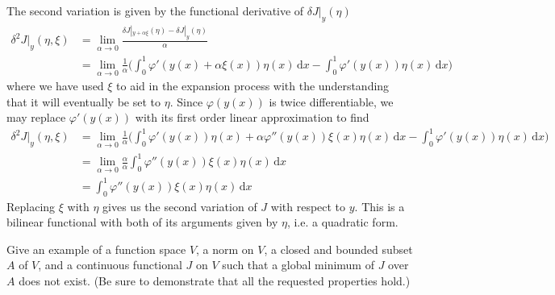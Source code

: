 \documentclass[../calculus-of-variations-and-optimal-control-theory.tex]{subfiles}
\begin{document}
\begin{questions}
\begin{solution}
	The second variation is given by the functional derivative of $\delta J|_y(\eta)$
	\begin{align*}
		\delta^2 J|_y(\eta, \xi) &= \lim_{\alpha\to0}\frac{\delta J|_{y+\alpha\xi}(\eta) - \delta J|_y(\eta)}{\alpha} \\
		&= \lim_{\alpha\to0}\frac{1}{\alpha}\Big(\int_0^1\varphi'(y(x) + \alpha\xi(x))\eta(x)\,\mathrm{d}x - \int_0^1\varphi'(y(x))\eta(x)\,\mathrm{d}x\Big)
	\end{align*}
	where we have used $\xi$ to aid in the expansion process with the understanding that it will eventually be set to $\eta$. Since $\varphi(y(x))$ is twice differentiable, we may replace $\varphi'(y(x))$ with its first order linear approximation to find
	\begin{align*}
		\delta^2J|_y(\eta, \xi) &= \lim_{\alpha\to0}\frac{1}{\alpha}\Big(\int_0^1\varphi'(y(x))\eta(x) + \alpha\varphi''(y(x))\xi(x)\eta(x)\,\mathrm{d}x - \int_0^1\varphi'(y(x))\eta(x)\,\mathrm{d}x\Big) \\
		&= \lim_{\alpha\to0}\frac{\alpha}{\alpha}\int_0^1\varphi''(y(x))\xi(x)\eta(x)\,\mathrm{d}x \\
		&= \int_0^1\varphi''(y(x))\xi(x)\eta(x)\,\mathrm{d}x
	\end{align*}
	Replacing $\xi$ with $\eta$ gives us the second variation of $J$ with respect to $y$. This is a bilinear functional with both of its arguments given by $\eta$, i.e. a quadratic form.
\end{solution}

\question Give an example of a function space $V$, a norm on $V$, a closed and bounded subset $A$ of $V$, and a continuous functional $J$ on $V$ such that a global minimum of $J$ over $A$ does not exist. (Be sure to demonstrate that all the requested properties hold.)

\end{questions}
\end{document}
